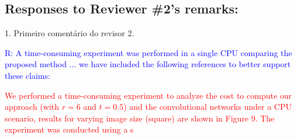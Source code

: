 \documentclass[11pt,a4paper]{article}
\begin{document}
\subsection*{Responses to Reviewer \#2's remarks:}


1. Primeiro comentário do revisor 2.

\textcolor{blue}{R: A time-consuming experiment was performed in a single CPU comparing the proposed method ... we have included the following references to better support these claims: ~\cite{bouvier2008,tola2010daisy}}

\textcolor{red}{We performed a time-consuming experiment to analyze the cost to compute our approach (with $r=6$ and $t=0.5$) and the convolutional networks under a CPU scenario, results for varying image size (square) are shown in Figure 9. The experiment was conducted using a s}


\end{document}
